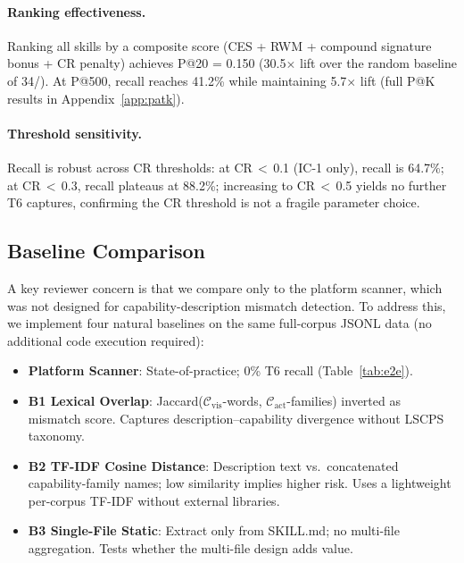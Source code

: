 \paragraph{Ranking effectiveness.}
Ranking all \NskillsDMR{} skills by a composite score
(CES + RWM + compound signature bonus + CR penalty)
achieves P@20 = 0.150 (30.5$\times$ lift over the
random baseline of 34/\NskillsDMR).
At P@500, recall reaches 41.2\% while maintaining
5.7$\times$ lift (full P@K results in
Appendix~\ref{app:patk}).

\paragraph{Threshold sensitivity.}
Recall is robust across CR thresholds:
at CR$\,<\,$0.1 (IC-1 only), recall is 64.7\%;
at CR$\,<\,$0.3, recall plateaus at 88.2\%;
increasing to CR$\,<\,$0.5 yields no further T6
captures, confirming the CR threshold is not
a fragile parameter choice.

\subsection{Baseline Comparison}
\label{sec:baselines}

A key reviewer concern is that we compare only to the platform scanner,
which was not designed for capability-description mismatch detection.
To address this, we implement four natural baselines on the same full-corpus
JSONL data ({\small no additional code execution required}):

\begin{itemize}[topsep=2pt,itemsep=1pt]
\item \textbf{Platform Scanner}: State-of-practice; 0\% T6 recall (Table~\ref{tab:e2e}).
\item \textbf{B1 Lexical Overlap}: Jaccard($\mathcal{C}_{\text{vis}}$-words,
  $\mathcal{C}_{\text{act}}$-families) inverted as mismatch score.
  Captures description--capability divergence without LSCPS taxonomy.
\item \textbf{B2 TF-IDF Cosine Distance}: Description text vs.\ concatenated
  capability-family names; low similarity implies higher risk.
  Uses a lightweight per-corpus TF-IDF without external libraries.
\item \textbf{B3 Single-File Static}: Extract only from SKILL.md;
  no multi-file aggregation. Tests whether the multi-file design adds value.
\end{itemize}

